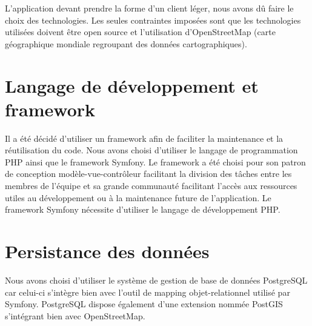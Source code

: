 

L'application devant prendre la forme d'un client léger, nous avons dû faire le choix des technologies. Les seules contraintes imposées sont que les technologies utilisées doivent être open source et l'utilisation d'OpenStreetMap (carte géographique mondiale regroupant des données cartographiques).

\section{Langage de développement et framework}
Il a été décidé d'utiliser un framework afin de faciliter la maintenance et la réutilisation du code.
Nous avons choisi d'utiliser le langage de programmation PHP ainsi que le framework Symfony. Le framework a été choisi pour son patron de conception modèle-vue-contrôleur facilitant la division des tâches entre les membres de l'équipe et sa grande communauté facilitant l'accès aux ressources utiles au développement ou à la maintenance future de l'application.
Le framework Symfony nécessite d'utiliser le langage de développement PHP. 

\section{Persistance des données}
Nous avons choisi d'utiliser le système de gestion de base de données PostgreSQL car celui-ci s'intègre bien avec l'outil de mapping objet-relationnel utilisé par Symfony. PostgreSQL dispose également d'une extension nommée PostGIS s'intégrant bien avec OpenStreetMap.